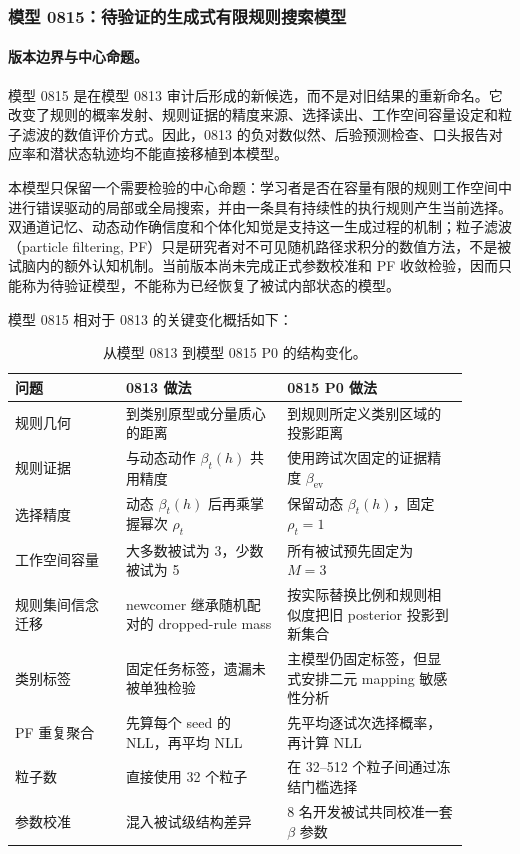 
\subsubsection{模型 0815：待验证的生成式有限规则搜索模型}

\paragraph{版本边界与中心命题。}
模型 0815 是在模型 0813 审计后形成的新候选，而不是对旧结果的重新命名。它改变了规则的概率发射、规则证据的精度来源、选择读出、工作空间容量设定和粒子滤波的数值评价方式。因此，0813 的负对数似然、后验预测检查、口头报告对应率和潜状态轨迹均不能直接移植到本模型。

本模型只保留一个需要检验的中心命题：学习者是否在容量有限的规则工作空间中进行错误驱动的局部或全局搜索，并由一条具有持续性的执行规则产生当前选择。双通道记忆、动态动作确信度和个体化知觉是支持这一生成过程的机制；粒子滤波（particle filtering, PF）只是研究者对不可见随机路径求积分的数值方法，不是被试脑内的额外认知机制。当前版本尚未完成正式参数校准和 PF 收敛检验，因而只能称为待验证模型，不能称为已经恢复了被试内部状态的模型。

模型 0815 相对于 0813 的关键变化概括如下：
\begin{table}[htbp]
\centering
\small
\caption{从模型 0813 到模型 0815 P0 的结构变化。}
\label{tab:m0815-changes}
\begin{tabular}{p{0.22\linewidth}p{0.32\linewidth}p{0.36\linewidth}}
\hline
问题 & 0813 做法 & 0815 P0 做法 \\
\hline
规则几何 & 到类别原型或分量质心的距离 & 到规则所定义类别区域的投影距离 \\
规则证据 & 与动态动作 $\beta_t(h)$ 共用精度 & 使用跨试次固定的证据精度 $\beta_{\mathrm{ev}}$ \\
选择精度 & 动态 $\beta_t(h)$ 后再乘掌握幂次 $\rho_t$ & 保留动态 $\beta_t(h)$，固定 $\rho_t=1$ \\
工作空间容量 & 大多数被试为 3，少数被试为 5 & 所有被试预先固定为 $M=3$ \\
规则集间信念迁移 & newcomer 继承随机配对的 dropped-rule mass & 按实际替换比例和规则相似度把旧 posterior 投影到新集合 \\
类别标签 & 固定任务标签，遗漏未被单独检验 & 主模型仍固定标签，但显式安排二元 mapping 敏感性分析 \\
PF 重复聚合 & 先算每个 seed 的 NLL，再平均 NLL & 先平均逐试次选择概率，再计算 NLL \\
粒子数 & 直接使用 32 个粒子 & 在 32--512 个粒子间通过冻结门槛选择 \\
参数校准 & 混入被试级结构差异 & 8 名开发被试共同校准一套 $\beta$ 参数 \\
\hline
\end{tabular}
\end{table}

